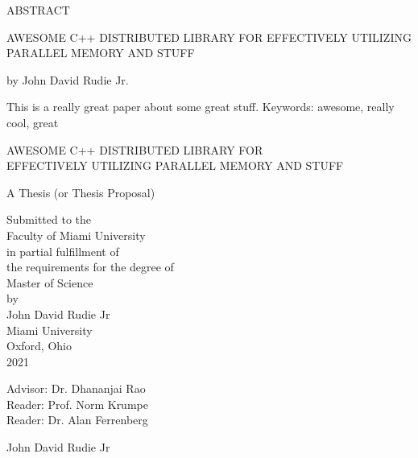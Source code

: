 \documentclass[12pt, oneside]{book2}
\begin{document}
\thispagestyle{empty}
\singlespacing

\begin{center}
ABSTRACT

\vspace{2.0cm}

AWESOME C++ DISTRIBUTED LIBRARY FOR EFFECTIVELY UTILIZING PARALLEL MEMORY AND STUFF

\vspace{1.0cm}

by John David Rudie Jr.

\vspace{1.0cm}
\end{center}

\noindent This is a really great paper about some great stuff. Keywords: awesome, really cool, great

\newpage

\thispagestyle{empty}

\frontmatter

\doublespacing

\begin{titlepage}
\begin{center}
AWESOME C++ DISTRIBUTED LIBRARY FOR \\EFFECTIVELY UTILIZING PARALLEL MEMORY AND STUFF


\vspace{1.5cm}

A Thesis (or Thesis Proposal) \\

\vspace{0.5cm}

Submitted to the \\
Faculty of Miami University \\
in partial fulfillment of \\
the requirements for the degree of \\
Master of Science \\
by \\
John David Rudie Jr \\
Miami University \\
Oxford, Ohio \\
2021

\vspace{1.5cm}

Advisor: Dr. Dhananjai Rao\\
Reader: Prof. Norm Krumpe\\
Reader: Dr. Alan Ferrenberg\\


\vspace{1.5cm}

 John David Rudie Jr

\end{center}

\end{titlepage}
\end{document}
